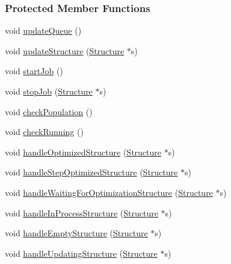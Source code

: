 \subsubsection*{Protected Member Functions}
\begin{DoxyCompactItemize}
\item 
void \hyperlink{classGlobalSearch_1_1QueueManager_a6fba282892d588e57520718d2f42401a}{update\+Queue} ()
\item 
void \hyperlink{classGlobalSearch_1_1QueueManager_a47014fddb8cfd2547899ca272dfb8b0a}{update\+Structure} (\hyperlink{classGlobalSearch_1_1Structure}{Structure} $\ast$s)
\item 
void \hyperlink{classGlobalSearch_1_1QueueManager_a643db68e2525754c897359dfff4dad66}{start\+Job} ()
\item 
void \hyperlink{classGlobalSearch_1_1QueueManager_ab4e0fef123622188942b2a4fe676dbd7}{stop\+Job} (\hyperlink{classGlobalSearch_1_1Structure}{Structure} $\ast$s)
\item 
void \hyperlink{classGlobalSearch_1_1QueueManager_a3c3de93fbb6a3f33d14ce74c541ba690}{check\+Population} ()
\item 
void \hyperlink{classGlobalSearch_1_1QueueManager_a2a85ad6729d9e0eb13782699b6cd5ccd}{check\+Running} ()
\item 
void \hyperlink{classGlobalSearch_1_1QueueManager_aabd2eebaed91b006309adff376cfc22a}{handle\+Optimized\+Structure} (\hyperlink{classGlobalSearch_1_1Structure}{Structure} $\ast$s)
\item 
void \hyperlink{classGlobalSearch_1_1QueueManager_ab9feeb85163af25cd067a5279cccff44}{handle\+Step\+Optimized\+Structure} (\hyperlink{classGlobalSearch_1_1Structure}{Structure} $\ast$s)
\item 
void \hyperlink{classGlobalSearch_1_1QueueManager_a6333f3ba572efd281e6dfd489c01ef8d}{handle\+Waiting\+For\+Optimization\+Structure} (\hyperlink{classGlobalSearch_1_1Structure}{Structure} $\ast$s)
\item 
void \hyperlink{classGlobalSearch_1_1QueueManager_a14667778b10fd542941121f75c01e522}{handle\+In\+Process\+Structure} (\hyperlink{classGlobalSearch_1_1Structure}{Structure} $\ast$s)
\item 
void \hyperlink{classGlobalSearch_1_1QueueManager_afe51c49057d5d0b8fa5ac1272e31fe9f}{handle\+Empty\+Structure} (\hyperlink{classGlobalSearch_1_1Structure}{Structure} $\ast$s)
\item 
void \hyperlink{classGlobalSearch_1_1QueueManager_a82b9d1f1df369bf14c1de84e0b4b5d70}{handle\+Updating\+Structure} (\hyperlink{classGlobalSearch_1_1Structure}{Structure} $\ast$s)

\end{DoxyCompactItemize}
